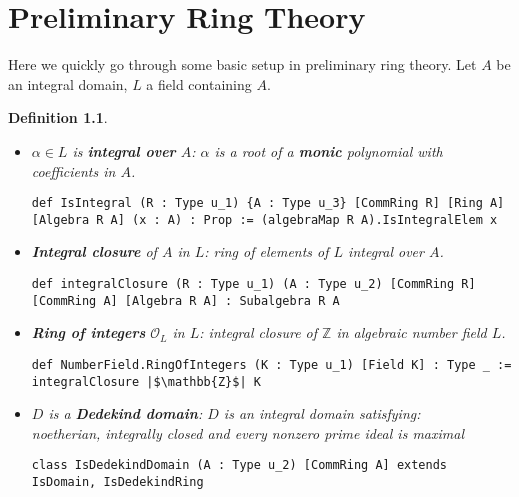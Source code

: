 \chapter{Preliminary Ring Theory}
\label{cp:ring}
Here we quickly go through some basic setup in preliminary ring theory. Let $A$ be an integral domain, $L$ a field containing $A$.
\newtheorem{defi}{Definition}[chapter]
\begin{defi}
~\begin{itemize}
    \item[] $\alpha \in L$ is \textbf{integral over} $A$: $\alpha$ is a root of a \textbf{monic} polynomial with coefficients in $A$.
    \begin{listing}[!htpb]
    \begin{verbatim}
def IsIntegral (R : Type u_1) {A : Type u_3} [CommRing R] [Ring A] [Algebra R A] (x : A) : Prop := (algebraMap R A).IsIntegralElem x
    \end{verbatim}
    \end{listing}
    \item[] \textbf{Integral closure} of $A$ in $L$: ring of elements of $L$ integral over $A$.
    \begin{listing}[!htpb]
    \begin{verbatim}
def integralClosure (R : Type u_1) (A : Type u_2) [CommRing R] [CommRing A] [Algebra R A] : Subalgebra R A
    \end{verbatim}
    \end{listing}
    \item[] \textbf{Ring of integers} $\mathcal{O}_L$ in $L$: integral closure of $\mathbb{Z}$ in algebraic number field $L$.
    \begin{listing}[!htpb]
    \begin{verbatim}
def NumberField.RingOfIntegers (K : Type u_1) [Field K] : Type _ := integralClosure |$\mathbb{Z}$| K
    \end{verbatim}
    \end{listing}
    \item[] $D$ is a \textbf{Dedekind domain}: $D$ is an integral domain satisfying: \\noetherian, integrally closed and every nonzero prime ideal is maximal
    \begin{listing}[!htpb]
    \begin{verbatim}
class IsDedekindDomain (A : Type u_2) [CommRing A] extends IsDomain, IsDedekindRing
    \end{verbatim}
    \end{listing}
\end{itemize}
\end{defi}

